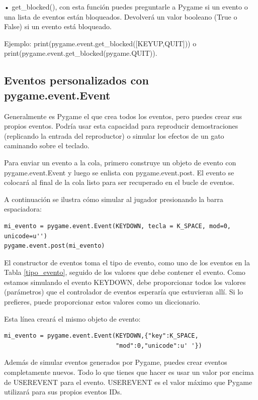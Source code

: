•  {\ttfamily get\_blocked()}, con esta función puedes preguntarle a Pygame si un evento o una lista de eventos están bloqueados. 
Devolverá un valor booleano (True o False) si un evento está bloqueado. 

\noindent Ejemplo: {\ttfamily print(pygame.event.get\_blocked([KEYUP,QUIT])) } o  \\ {\ttfamily print(pygame.event.get\_blocked(pygame.QUIT))}.

\subsection{Eventos personalizados con pygame.event.Event}

Generalmente es Pygame el que crea todos los eventos, pero  puedes crear sus propios eventos.
Podría usar esta capacidad para reproducir demostraciones (replicando la entrada del reproductor) o simular los
efectos de un gato caminando sobre el teclado. 

Para enviar un evento a la cola, primero construye un objeto de evento con {\ttfamily pygame.event.Event} y luego se enlista
con {\ttfamily pygame.event.post}. El evento se colocará al final de la cola listo para ser recuperado
en el bucle de eventos. 

A continuación se ilustra cómo simular al jugador presionando la barra espaciadora:

\begin{lstlisting}		
mi_evento = pygame.event.Event(KEYDOWN, tecla = K_SPACE, mod=0, unicode=u'')
pygame.event.post(mi_evento)	

\end{lstlisting}
El constructor de eventos toma el tipo de evento, como uno de los eventos en la Tabla \ref{tipo_evento},
seguido de los valores que debe contener el evento. Como estamos simulando el evento  {\ttfamily KEYDOWN},
debe proporcionar todos los valores (parámetros) que el controlador de eventos esperaría que estuvieran allí.
Si lo prefieres, puede proporcionar estos valores como un diccionario.

Esta línea creará el mismo objeto de evento:

\begin{lstlisting}
mi_evento = pygame.event.Event(KEYDOWN,{"key":K_SPACE,
                               "mod":0,"unicode":u' '})
\end{lstlisting}

Además de simular eventos generados por Pygame, puedes crear eventos completamente nuevos. Todo lo que tienes que hacer
es usar un valor por encima de  {\ttfamily USEREVENT} para el evento.   {\ttfamily USEREVENT} es el valor  máximo  
que Pygame utilizará para sus propios eventos IDs. 

